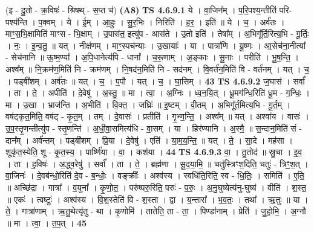 \documentclass[17pt]{extarticle}
\begin{document}
                  \newline
                      (इ - दु॒तो - क्र॒विषः॑ - श्रिषथ् - स॒प्त च॑)  \textbf{(A8)} \newline \newline
                                \textbf{ TS 4.6.9.1} \newline
                  ये । वा॒जिन᳚म् । प॒रि॒पश्य॒न्तीति॑ परि-पश्य॑न्ति । प॒क्वम् । ये । ई॒म् । आ॒हुः । सु॒र॒भिः । निरिति॑ । ह॒र॒ । इति॑ ॥ ये । च॒ । अर्व॑तः । माꣳ॒॒स॒भि॒क्षामिति॑ माꣳस - भि॒क्षाम् । उ॒पास॑त॒ इत्यु॑प - आस॑ते । उ॒तो इति॑ । तेषा᳚म् । अ॒भिगू᳚र्ति॒रित्य॒भि - गू॒र्तिः॒ । नः॒ । इ॒न्व॒तु॒ ॥ यत् । नीक्ष॑णम् । माꣳ॒॒स्पच॑न्याः । उ॒खायाः᳚ । या । पात्रा॑णि । यू॒ष्णः । आ॒सेच॑ना॒नीत्या᳚ - सेच॑नानि ॥ ऊ॒ष्म॒ण्या᳚ । अ॒पि॒धानेत्य॑पि - धाना᳚ । च॒रू॒णाम् । अ॒ङ्काः । सू॒नाः । परीति॑ । भू॒ष॒न्ति॒ । अश्व᳚म् ॥ नि॒क्रम॑ण॒मिति॑ नि - क्रम॑णम् । नि॒षद॑न॒मिति॑ नि - सद॑नम् । वि॒वर्त॑न॒मिति॑ वि - वर्त॑नम् । यत् । च॒ । पड्बी॑शम् । अर्व॑तः ॥ यत् । च॒ । प॒पौ । यत् । च॒ । घा॒सिम् । \textbf{  43} \newline
                  \newline
                                \textbf{ TS 4.6.9.2} \newline
                  ज॒घास॑ । सर्वा᳚ । ता । ते॒ । अपीति॑ । दे॒वेषु॑ । अ॒स्तु॒ ॥ मा । त्वा॒ । अ॒ग्निः । ध्व॒न॒यि॒त् । धू॒मग॑न्धि॒रिति॑ धू॒म - ग॒न्धिः॒ । मा । उ॒खा । भ्राज॑न्ति । अ॒भीति॑ । वि॒क्त॒ । जघ्रिः॑ ॥ इ॒ष्टम् । वी॒तम् । अ॒भिगू᳚र्त॒मित्य॒भि - गू॒र्त॒म् । वष॑ट्कृत॒मिति॒ वष॑ट् - कृ॒त॒म् । तम् । दे॒वासः॑ । प्रतीति॑ । गृ॒भ्ण॒न्ति॒ । अश्व᳚म् ॥ यत् । अश्वा॑य । वासः॑ । उ॒प॒स्तृ॒णन्तीत्यु॑प - स्तृ॒णन्ति॑ । अ॒धी॒वा॒समित्य॑धि - वा॒सम् । या । हिर॑ण्यानि । अ॒स्मै॒ ॥ स॒न्दान॒मिति॑ सं - दान᳚म् । अर्व॑न्तम् । पड्बी॑शम् । प्रि॒या । दे॒वेषु॑ । एति॑ । या॒म॒य॒न्ति॒ ॥ यत् । ते॒ । सा॒दे । मह॑सा । शूकृ॑त॒स्येति॒ शू - कृ॒त॒स्य॒ । पार्ष्णि॑या । वा॒ । कश॑या । \textbf{  44 } \newline
                  \newline
                                \textbf{ TS 4.6.9.3} \newline
                  वा॒ । तु॒तोद॑ ॥ स्रु॒चा । इ॒व॒ । ता । ह॒विषः॑ । अ॒द्ध्व॒रेषु॑ । सर्वा᳚ । ता । ते॒ । ब्रह्म॑णा । सू॒द॒या॒मि॒ ॥ चतु॑स्त्रिꣳश॒दिति॒ चतुः॑ - त्रिꣳ॒॒श॒त् । वा॒जिनः॑ । दे॒वब॑न्धो॒रिति॑ दे॒व - ब॒न्धोः॒ । वङ्क्रीः᳚ । अश्व॑स्य । स्वधि॑ति॒रिति॒ स्व - धि॒तिः॒ । समिति॑ । ए॒ति॒ ॥ अच्छि॑द्रा । गात्रा᳚ । व॒युना᳚ । कृ॒णो॒त॒ । परु॑ष्परु॒रिति॒ परुः॑ - प॒रुः॒ । अ॒नु॒घुष्येत्य॑नु-घुष्य॑ । वीति॑ । श॒स्त॒ ॥ एकः॑ । त्वष्टुः॑ । अश्व॑स्य । वि॒श॒स्तेति॑ वि - श॒स्ता । द्वा । य॒न्तारा᳚ । भ॒व॒तः॒ । तथा᳚ । ऋ॒तुः ॥ या । ते॒ । गात्रा॑णाम् । ऋ॒तु॒थेत्यृ॑तु - था । कृ॒णोमि॑ । तातेति॒ ता - ता॒ । पिण्डा॑नाम् । प्रेति॑ । जु॒हो॒मि॒ । अ॒ग्नौ ॥ मा । त्वा॒ । त॒प॒त् । \textbf{  45} \newline
\end{document}
